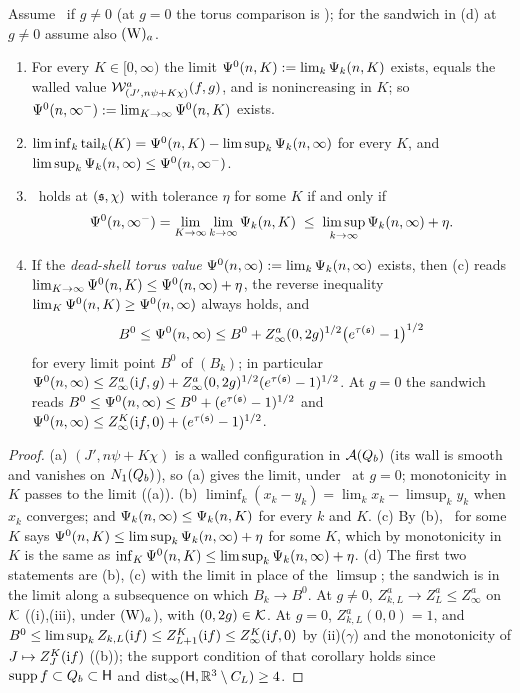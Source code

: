 \begin{theorem}\label{rot:thm:cont}
Assume \Ka\ if $g\ne0$ (at $g=0$ the torus comparison is ); for the sandwich in \textup{(d)} at $g\ne0$ assume also $(\mathrm W)_{a}$.
\begin{enumerate}[label=\textup{(\alph*)},leftmargin=*]
\item For every $K\in[0,\infty)$ the limit $\Psi^0(n,K):=\lim_k\Psi_k(n,K)$ exists, equals the walled value $\mathcal W^a_{(J',n\psi+K\chi)}(f,g)$, and is nonincreasing in $K$; so $\Psi^0(n,\infty^-):=\lim_{K\to\infty}\Psi^0(n,K)$ exists.
\item $\liminf_k\operatorname{tail}_k(K)=\Psi^0(n,K)-\limsup_k\Psi_k(n,\infty)$ for every $K$, and $\limsup_k\Psi_k(n,\infty)\le\Psi^0(n,\infty^-)$.
\item \REa\ holds at $(\mathfrak s,\chi)$ with tolerance $\eta$ for some $K$ if and only if
\[
\Psi^0(n,\infty^-)=\lim_{K\to\infty}\lim_{k\to\infty}\Psi_k(n,K)\;\le\;\limsup_{k\to\infty}\Psi_k(n,\infty)+\eta .
\]
\item If the \emph{dead-shell torus value} $\Psi^0(n,\infty):=\lim_k\Psi_k(n,\infty)$ exists, then \textup{(c)} reads $\lim_{K\to\infty}\Psi^0(n,K)\le\Psi^0(n,\infty)+\eta$, the reverse inequality $\lim_K\Psi^0(n,K)\ge\Psi^0(n,\infty)$ always holds, and
\[
B^0\le\Psi^0(n,\infty)\le B^0+Z^a_\infty(0,2g)^{1/2}\big(e^{\tau(\mathfrak s)}-1\big)^{1/2}
\]
for every limit point $B^0$ of $(B_k)$; in particular $\Psi^0(n,\infty)\le Z^a_\infty(\mathrm if,g)+Z^a_\infty(0,2g)^{1/2}(e^{\tau(\mathfrak s)}-1)^{1/2}$. At $g=0$ the sandwich reads $B^0\le\Psi^0(n,\infty)\le B^0+(e^{\tau(\mathfrak s)}-1)^{1/2}$ and $\Psi^0(n,\infty)\le Z^{K}_{\infty}(\mathrm if,0)+(e^{\tau(\mathfrak s)}-1)^{1/2}$.
\end{enumerate}
\end{theorem}

\begin{proof}
(a) $(J',n\psi+K\chi)$ is a walled configuration in $\mathcal A(Q_{b})$ (its wall is smooth and vanishes on $N_{1}(Q_{b})$), so (a) gives the limit, under \Kz\ at $g=0$; monotonicity in $K$ passes to the limit ((a)). (b) $\liminf_k(x_k-y_k)=\lim_kx_k-\limsup_ky_k$ when $x_k$ converges; and $\Psi_k(n,\infty)\le\Psi_k(n,K)$ for every $k$ and $K$. (c) By (b), \REa\ for some $K$ says $\Psi^0(n,K)\le\limsup_k\Psi_k(n,\infty)+\eta$ for some $K$, which by monotonicity in $K$ is the same as $\inf_K\Psi^0(n,K)\le\limsup_k\Psi_k(n,\infty)+\eta$. (d) The first two statements are (b), (c) with the limit in place of the $\limsup$; the sandwich is  in the limit along a subsequence on which $B_k\to B^0$. At $g\ne0$, $Z^a_{k,L}\to Z^a_L\le Z^a_\infty$ on $\mathcal K$ ((i),(iii), under $(\mathrm W)_{a}$), with $(0,2g)\in\mathcal K$. At $g=0$, $Z^a_{k,L}(0,0)=1$, and $B^0\le\limsup_kZ_{k,L}(\mathrm if)\le Z^K_{L+1}(\mathrm if)\le Z^{K}_{\infty}(\mathrm if,0)$ by (ii)($\gamma$) and the monotonicity of $J\mapsto Z^{K}_{J}(\mathrm if)$ ((b)); the support condition of that corollary holds since $\operatorname{supp} f\subset Q_{b}\subset\mathsf H$ and $\operatorname{dist}_\infty(\mathsf H,\mathbb R^3\setminus C_L)\ge4$.
\end{proof}

